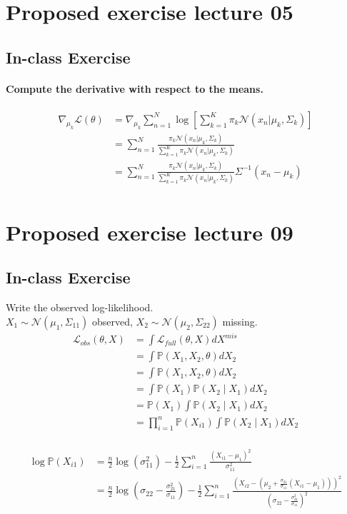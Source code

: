 \documentclass{article}
\newcommand{\1}{\mathbf{1}}
\renewcommand{\P}{\mathbb{P}}
\renewcommand{\L}{\mathcal{L}}
\begin{document}
\section{Proposed exercise lecture 05}
\subsection{In-class Exercise}
\paragraph{Compute the derivative with respect to the means.}
\begin{align*}
  \nabla_{\mu_k}\mathcal{L}(\theta)
  & =
  \nabla_{\mu_k} \sum_{n=1}^N \log \left[ \sum_{k=1}^K \pi_k \mathcal{N}(x_n|\mu_k, \Sigma_k)\right]                   \\
   & =
  \sum_{n=1}^N \frac{\pi_k \mathcal{N}(x_n|\mu_k, \Sigma_k)}{\sum_{k=1}^K \pi_k \mathcal{N}(x_n|\mu_k, \Sigma_k)} \\
   & =
  \sum_{n=1}^N \frac{\pi_k \mathcal{N}(x_n|\mu_k, \Sigma_k)}{\sum_{k=1}^K \pi_k \mathcal{N}(x_n|\mu_k, \Sigma_k)} \Sigma^{-1} (x_n - \mu_k)\\
\end{align*}

\section{Proposed exercise lecture 09}
\subsection{In-class Exercise}
Write the observed log-likelihood. \\
$X_1 \sim \mathcal{N}(\mu_1, \Sigma_{11})$ observed, $X_2 \sim \mathcal{N}(\mu_2, \Sigma_{22})$ missing.
\begin{align*}
  \L_{obs} (\theta, X)
  &= \int \L_{full} (\theta, X) dX^{mis} \\
  &= \int \P (X_1, X_2, \theta) dX_{2} \\
  &= \int \P(X_1, X_2, \theta) dX_{2} \\
  &= \int \P(X_1) \P(X_2 \mid X_1) dX_{2} \\
  &= \P(X_1) \int \P(X_2 \mid X_1) dX_{2} \\
  &= \prod_{i=1}^n \P(X_{i1}) \int \P(X_2 \mid X_1) dX_{2} \\
\end{align*}

\begin{align*}
  \log \P(X_{i1})
  &= \frac{n}{2}\log(\sigma_{11}^2) - \frac{1}{2} \sum_{i=1}^n \frac{(X_{i1} - \mu_1)^2}{\sigma_{11}^2} \\
  &= \frac{n}{2}\log(\sigma_{22} - \frac{\sigma_{21}^2}{\sigma_{11}}) - \frac{1}{2} \sum_{i=1}^n \frac{(X_{i2} - (\mu_2 + \frac{\sigma_{21}}{\sigma_{11}} (X_{i1} - \mu_1)))^2}{(\sigma_{22} - \frac{\sigma_{21}^2}{\sigma_{11}})^2} \\
\end{align*}
\end{document}
